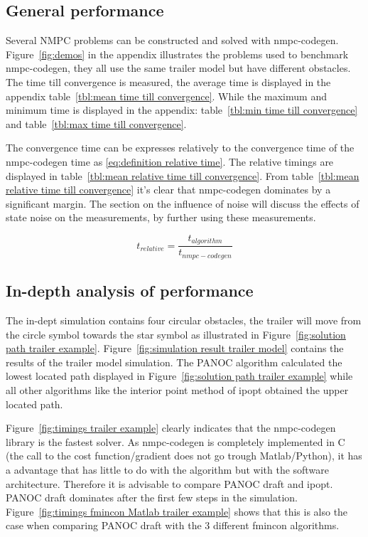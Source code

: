 \subsection{General performance}
Several NMPC problems can be constructed and solved with nmpc-codegen. Figure~\ref{fig:demos} in the appendix illustrates the problems used to benchmark nmpc-codegen, they all use the same trailer model but have different obstacles. The time till convergence is measured, the average time is displayed in the appendix table~\ref{tbl:mean time till convergence}. While the maximum and minimum time is displayed in the appendix: table~\ref{tbl:min time till convergence} and table~\ref{tbl:max time till convergence}.

The convergence time can be expresses relatively to the convergence time of the nmpc-codegen time as \eqref{eq:definition relative time}. The relative timings are displayed in table~\ref{tbl:mean relative time till convergence}. From table~\ref{tbl:mean relative time till convergence} it's clear that nmpc-codegen dominates by a significant margin. The section on the influence of noise will discuss the effects of state noise on the measurements, by further using these measurements.

\begin{equation}
	t_{relative} = \frac{t_{algorithm}}{t_{nmpc-codegen}}
	\label{eq:definition relative time}
\end{equation}

\subsection{In-depth analysis of performance}
The in-dept simulation contains four circular obstacles, the trailer will move from the circle symbol towards the star symbol as illustrated in Figure~\ref{fig:solution path trailer example}. Figure~\ref{fig:simulation result trailer model} contains the results of the trailer model simulation. The PANOC algorithm calculated the lowest located path displayed in Figure~\ref{fig:solution path trailer example} while all other algorithms like the interior point method of ipopt obtained the upper located path.

Figure~\ref{fig:timings trailer example} clearly indicates that the nmpc-codegen library is the fastest solver. As nmpc-codegen is completely implemented in C (the call to the cost function/gradient does not go trough Matlab/Python), it has a advantage that has little to do with the algorithm but with the software architecture. Therefore it is advisable to compare PANOC draft and ipopt. PANOC draft dominates after the first few steps in the simulation. Figure~\ref{fig:timings fmincon Matlab trailer example} shows that this is also the case when comparing PANOC draft with the 3 different fmincon algorithms.

